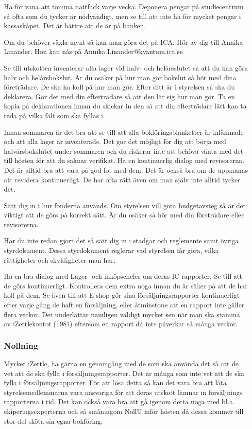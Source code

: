 \documentclass[10pt]{article}
\begin{document}
Ha för vana att tömma nattfack varje vecka. Deponera pengar på studiecentrum så ofta som du tycker är nödvändigt, men se till att inte ha för mycket pengar i kassaskåpet. Det är bättre att de är på banken. 

Om du behöver växla mynt så kan man göra det på ICA. Hör av dig till Annika Linander. Hon kan nås på Annika.Linander@kvantum.ica.se

Se till utskotten inventerar alla lager vid halv- och helårsslutet så att du kan göra halv och helårsbokslut. Är du osäker på hur man gör bokslut så hör med dina företrädare. De ska ha koll på hur man gör. Efter ditt år i styrelsen så ska du deklarera. Gör det med din efterträdare så att den lär sig hur man gör. Ta en kopia på deklarationen innan du skickar in den så att din efterträdare lätt kan ta reda på vilka fält som ska fyllas i.

Innan sommaren är det bra att se till att alla bokföringsblanketter är inlämnade och att alla lager är inventerade. Det gör det möjligt för dig att börja med halvårsbokslutet under sommaren och du riskerar inte att behöva vänta med det till hösten för att du saknar verifikat. 
Ha en kontinuerlig dialog med revisorerna. Det är alltid bra att vara på god fot med dem. Det är också bra om de uppmanas att revidera kontinuerligt. De har ofta rätt även om man själv inte alltid tycker det.

Sätt dig in i hur fonderna används. Om styrelsen vill göra budgetavsteg så är det viktigt att de görs på korrekt sätt. Är du osäker så hör med din företrädare eller revisorerna.

Har du inte redan gjort det så sätt dig in i stadgar och reglemente samt övriga styrdokument. Dessa styrdokument reglerar vad styrelsen får göra, vilka rättigheter och skyldigheter man har.

Ha en bra dialog med Lager- och inköpschefer om deras IC-rapporter. Se till att de görs kontinuerligt. Kontrollera dem extra noga innan du är säker på att de har koll på dem.
Se även till att E-shop gör sina försäljningsrapporter kontinuerligt efter varje gång de haft en försäljning, eller åtminstone att en rapport inte gäller flera veckor. Det underlättar nämligen väldigt mycket sen när man ska stämma av iZettlekontot (1981) eftersom en rapport då inte påverkar så många veckor. 

\subsubsection{Nollning}
Mycket iZettle, ha gärna en genomgång med de som ska använda det så att de vet att de ska fylla i försäljningsrapporter. 
Det är många som inte vet att de ska fylla i försäljningsrapporter. För att lösa detta så kan det vara bra att låta styrelsemedlemmarna vara ansvariga för att deras utskott lämnar in försäljnings rapporterna i tid. Det kan också vara bra att gå igenom detta noga med bl.a. ekiperingsexperterna och så småningom NollU inför hösten då dessa kommer till stor del sköta sin egna bokföring.
\end{document}
